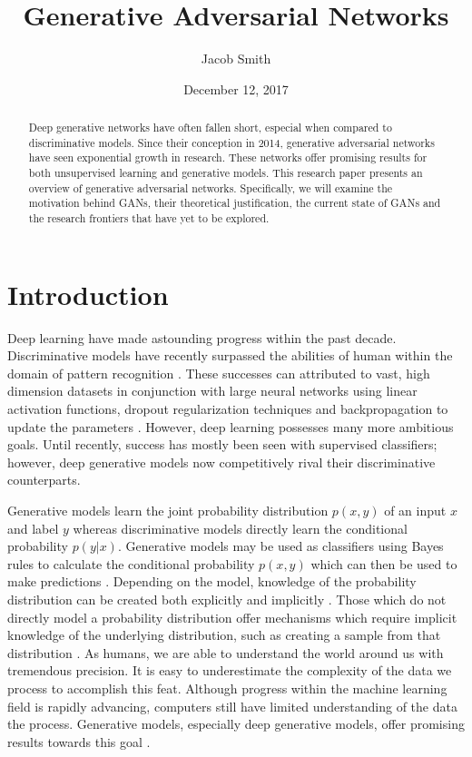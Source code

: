 \documentclass[11pt]{article}
\title{Generative Adversarial Networks}
\author{Jacob Smith}
\date{December 12, 2017}
\begin{document}
\maketitle

\begin{abstract}
    Deep generative networks have often fallen short, especial when compared to discriminative models. Since their conception in 2014, generative adversarial networks have seen exponential growth in research. These networks offer promising results for both unsupervised learning and generative models. This research paper presents an overview of generative adversarial networks. Specifically, we will examine the motivation behind GANs, their theoretical justification, the current state of GANs and the research frontiers that have yet to be explored.
\end{abstract}

\section{Introduction}
Deep learning have made astounding progress within the past decade. Discriminative models have recently surpassed the abilities of human within the domain of pattern recognition \citep{2014arXiv1404.7828S}. These successes can attributed to vast, high dimension datasets in conjunction with large neural networks using linear activation functions, dropout regularization techniques and backpropagation to update the parameters \citep{2014arXiv1406.2661G}. However, deep learning possesses many more ambitious goals. Until recently, success has mostly been seen with supervised classifiers; however, deep generative models now competitively rival their discriminative counterparts.

Generative models learn the joint probability distribution $p(x,y)$ of an input $x$ and label $y$ whereas discriminative models directly learn the conditional probability $p(y|x)$. Generative models may be used as classifiers using Bayes rules to calculate the conditional probability $p(x,y)$ which can then be used to make predictions \citep{NIPS2001_2020}. Depending on the model, knowledge of the probability distribution can be created both explicitly and implicitly \citep{Goodfellow-et-al-2016}. Those which do not directly model a probability distribution offer mechanisms which require implicit knowledge of the underlying distribution, such as creating a sample from that distribution \citep{Goodfellow-et-al-2016}. As humans, we are able to understand the world around us with tremendous precision. It is easy to underestimate the complexity of the data we process to accomplish this feat. Although progress within the machine learning field is rapidly advancing, computers still have limited understanding of the data the process. Generative models, especially deep generative models, offer promising results towards this goal \citep{genmodelingopenai}.
\end{document}
